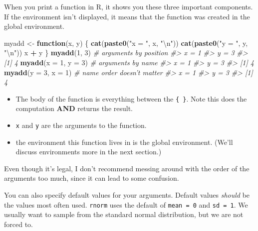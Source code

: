 \documentclass[]{book}
\newenvironment{Shaded}{\begin{snugshade}}{\end{snugshade}}
\newcommand{\KeywordTok}[1]{\textcolor[rgb]{0.13,0.29,0.53}{\textbf{#1}}}
\newcommand{\DataTypeTok}[1]{\textcolor[rgb]{0.13,0.29,0.53}{#1}}
\newcommand{\DecValTok}[1]{\textcolor[rgb]{0.00,0.00,0.81}{#1}}
\newcommand{\CharTok}[1]{\textcolor[rgb]{0.31,0.60,0.02}{#1}}
\newcommand{\StringTok}[1]{\textcolor[rgb]{0.31,0.60,0.02}{#1}}
\newcommand{\CommentTok}[1]{\textcolor[rgb]{0.56,0.35,0.01}{\textit{#1}}}
\newcommand{\ControlFlowTok}[1]{\textcolor[rgb]{0.13,0.29,0.53}{\textbf{#1}}}
\newcommand{\OperatorTok}[1]{\textcolor[rgb]{0.81,0.36,0.00}{\textbf{#1}}}
\newcommand{\NormalTok}[1]{#1}
\providecommand{\tightlist}{%
  \setlength{\itemsep}{0pt}\setlength{\parskip}{0pt}}
\theoremstyle{definition}
\theoremstyle{definition}
\theoremstyle{definition}
\theoremstyle{remark}
\let\BeginKnitrBlock\begin \let\EndKnitrBlock\end
\begin{document}
When you print a function in R, it shows you these three important
components. If the environment isn't displayed, it means that the
function was created in the global environment.

\begin{Shaded}
\begin{Highlighting}[]
\NormalTok{myadd <-}\StringTok{ }\ControlFlowTok{function}\NormalTok{(x, y) \{}
  \KeywordTok{cat}\NormalTok{(}\KeywordTok{paste0}\NormalTok{(}\StringTok{"x = "}\NormalTok{, x, }\StringTok{"}\CharTok{\textbackslash{}n}\StringTok{"}\NormalTok{))}
  \KeywordTok{cat}\NormalTok{(}\KeywordTok{paste0}\NormalTok{(}\StringTok{"y = "}\NormalTok{, y, }\StringTok{"}\CharTok{\textbackslash{}n}\StringTok{"}\NormalTok{))}
\NormalTok{  x }\OperatorTok{+}\StringTok{ }\NormalTok{y}
\NormalTok{\}}
\KeywordTok{myadd}\NormalTok{(}\DecValTok{1}\NormalTok{, }\DecValTok{3}\NormalTok{)            }\CommentTok{# arguments by position}
\CommentTok{#> x = 1}
\CommentTok{#> y = 3}
\CommentTok{#> [1] 4}
\KeywordTok{myadd}\NormalTok{(}\DataTypeTok{x =} \DecValTok{1}\NormalTok{, }\DataTypeTok{y =} \DecValTok{3}\NormalTok{)    }\CommentTok{# arguments by name}
\CommentTok{#> x = 1}
\CommentTok{#> y = 3}
\CommentTok{#> [1] 4}
\KeywordTok{myadd}\NormalTok{(}\DataTypeTok{y =} \DecValTok{3}\NormalTok{, }\DataTypeTok{x =} \DecValTok{1}\NormalTok{)    }\CommentTok{# name order doesn't matter}
\CommentTok{#> x = 1}
\CommentTok{#> y = 3}
\CommentTok{#> [1] 4}
\end{Highlighting}
\end{Shaded}

\begin{itemize}
\tightlist
\item
  The body of the function is everything between the \texttt{\{\ \}}.
  Note this does the computation \textbf{AND} returns the result.
\item
  \texttt{x} and \texttt{y} are the arguments to the function.
\item
  the environment this function lives in is the global environment.
  (We'll discuss environments more in the next section.)
\end{itemize}

\BeginKnitrBlock{rmdtip}
Even though it's legal, I don't recommend messing around with the order
of the arguments too much, since it can lead to some confusion.
\EndKnitrBlock{rmdtip}

You can also specify default values for your arguments. Default values
\emph{should} be the values most often used. \texttt{rnorm} uses the
default of \texttt{mean\ =\ 0} and \texttt{sd\ =\ 1}. We usually want to
sample from the standard normal distribution, but we are not forced to.
\end{document}
